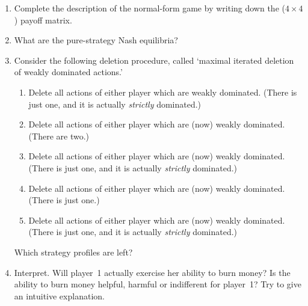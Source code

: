 \begin{exercise}
\begin{enumerate}[label=(\alph*)]
		\item Complete the description of the normal-form game by writing down the ($4 \times 4$) payoff matrix.

		\item What are the pure-strategy Nash equilibria?

		\item Consider the following deletion procedure, called `maximal iterated deletion of weakly dominated actions.'

		\begin{enumerate}[label=(\roman*)]
		
			\item Delete all actions of either player which are weakly dominated. (There is just one, and it is actually \emph{strictly} dominated.)

			\item Delete all actions of either player which are (now) weakly dominated. (There are two.)

			\item Delete all actions of either player which are (now) weakly dominated. (There is just one, and it is actually \emph{strictly} dominated.)

			\item Delete all actions of either player which are (now) weakly dominated. (There is just one.)

			\item Delete all actions of either player which are (now) weakly dominated. (There is just one, and it is actually \emph{strictly} dominated.)
		
		\end{enumerate}
		Which strategy profiles are left?

		\item Interpret. Will player~1 actually exercise her ability to burn money? Is the ability to burn money helpful, harmful or indifferent for player~1? Try to give an intuitive explanation.

	\end{enumerate}
\end{exercise}
